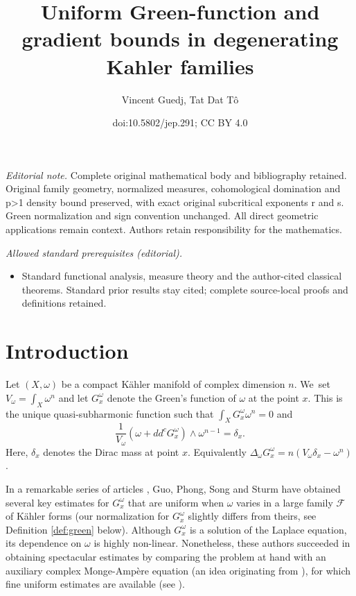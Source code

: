 \documentclass[10pt]{amsart}
\title{Uniform Green-function and gradient bounds in degenerating Kahler families}
\author{Vincent Guedj, Tat Dat Tô}
\date{doi:10.5802/jep.291; CC BY 4.0}
\theoremstyle{definition}
\providecommand{\mainmatter}{}\providecommand{\backmatter}{}
\begin{document}
\maketitle
\noindent\textit{Editorial note.} Complete original mathematical body and bibliography retained. Original family geometry, normalized measures, cohomological domination and p>1 density bound preserved, with exact original subcritical exponents r and s. Green normalization and sign convention unchanged. All direct geometric applications remain context. Authors retain responsibility for the mathematics.\par\medskip
\noindent\textit{Allowed standard prerequisites (editorial).}\begin{itemize}
\item Standard functional analysis, measure theory and the author-cited classical theorems. Standard prior results stay cited; complete source-local proofs and definitions retained.
\end{itemize}\medskip
\vspace*{-\baselineskip}
\tableofcontents
\mainmatter

\section*{Introduction}

Let $(X,\omega)$ be a compact Kähler manifold of complex dimension $n$. We~set $V_{\omega}=\int_X \omega^n$ and
let $G_x^{\omega}$ denote the Green's function of $\omega$ at the point $x$.
This is the unique quasi-subharmonic function such that $\int_X G_x^{\omega} \omega^n=0$ and
\[
\frac{1}{V_{\omega}} (\omega+dd^c G_x^{\omega}) \wedge \omega^{n-1}=\delta_x.
\]
Here, $\delta_x$ denotes the Dirac mass at point $x$. Equivalently
$\Delta_{\omega} G_x^{\omega}=n( V_{\omega} \delta_x -\omega^n)$.

In a remarkable series of articles \cite{GPS22,GPSS22,GPSS23}, Guo, Phong, Song and Sturm have
obtained several key estimates for $G_x^{\omega}$ that are uniform when $\omega$ varies
in a large family ${\mathcal F}$ of Kähler forms
(our normalization for $G_x^{\omega}$ slightly differs from theirs, see Definition \ref{def:green} below).
Although $G_x^{\omega}$ is a solution of the Laplace equation, its dependence on $\omega$ is highly non-linear.
Nonetheless, these authors succeeded in obtaining spectacular estimates by comparing the problem at hand with an auxiliary
complex Monge-Ampère equation (an idea originating from \cite{CC21}),
for which fine uniform estimates are available
(see \cite{Yau78,Kol98,EGZ09,EGZ08,DP10,BEGZ10,GL21,GPT23}).
\end{document}
